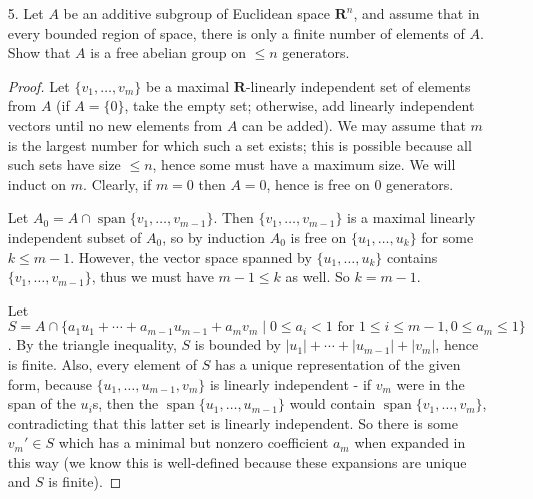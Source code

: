 \documentclass[10pt]{article}
\newcommand{\R}{\mathbf{R}}
\DeclareMathOperator*{\spn}{span}
\begin{document}
\begin{enumerate}
\begin{enumerate}
\begin{proof}
Next, assume $E$ is a direct product of submodules $E_i$, $\varphi_i$ is the inclusion of $E_i$, and $\psi$ is the projection onto $E_i$.  Then
$$
\psi_i \circ \varphi_j (x) = \psi_i((0, \dots , 0 , x , 0 , \dots , 0 ))
$$
is $x$ if $i = j$ and $0$ otherwise, so the first two properties are satisfied.  Also,
$$
\sum_1^m \varphi_i \circ \psi_i ( x_1, \dots , x_m) = \sum_1^m \psi_i(x_i) = \sum_1^m (0,\dots,0,x_i,0,\dots,0) = (x_1, \dots,x_m)
$$
so the last property is satisfied.
\end{proof}

\end{enumerate}

\item[5.]Let $A$ be an additive subgroup of Euclidean space $\R^n$, and assume that in every bounded region of space, there is only a finite number of elements of $A$.  Show that $A$ is a free abelian group on $\leq n$ generators.

\begin{proof}
Let $\{v_1, \dots , v_m\}$ be a maximal $\R$-linearly independent set of elements from $A$ (if $A=\{0\}$, take the empty set; otherwise, add linearly independent vectors until no new elements from $A$ can be added).  We may assume that $m$ is the largest number for which such a set exists; this is possible because all such sets have size $\leq n$, hence some must have a maximum size.  We will induct on $m$.  Clearly, if $m = 0$ then $A = 0$, hence is free on $0$ generators.

Let $A_0 = A \cap \spn \{v_1, \dots , v_{m-1}\}$.  Then $\{v_1, \dots , v_{m-1}\}$ is a maximal linearly independent subset of $A_0$, so by induction $A_0$ is free on $\{u_1, \dots , u_k\}$ for some $k \leq m-1$.  However, the vector space spanned by $\{u_1, \dots , u_k\}$ contains $\{v_1, \dots , v_{m-1}\}$, thus we must have $m-1 \leq k$ as well.  So $k = m-1$.

Let $S = A \cap \{a_1u_1 + \cdots + a_{m-1}u_{m-1} + a_mv_m \mid 0 \leq a_i < 1 \text{ for } 1 \leq i \leq m-1, 0 \leq a_m \leq 1 \}$.  By the triangle inequality, $S$ is bounded by $|u_1| + \cdots + |u_{m-1}| + |v_m|$, hence is finite.  Also, every element of $S$ has a unique representation of the given form, because $\{u_1, \dots , u_{m-1}, v_m\}$ is linearly independent - if $v_m$ were in the span of the $u_i$s, then the $\spn\{u_1, \dots , u_{m-1}\}$ would contain $\spn\{v_1, \dots , v_m\}$, contradicting that this latter set is linearly independent.  So there is some $v_m' \in S$ which has a minimal but nonzero coefficient $a_m$ when expanded in this way (we know this is well-defined because these expansions are unique and $S$ is finite).


\end{proof}
\end{enumerate}
\end{document}
